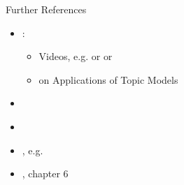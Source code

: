 \documentclass[
  ignorenonframetext,
]{beamer}
\begin{document}
\begin{frame}{Further References}
\protect\hypertarget{further-references}{}

\begin{itemize}

  \item  \href{http://users.umiacs.umd.edu/~jbg/}{\color{blue}{Jordan Boyd Graber at UMD}}: 
 \begin{itemize}
      \item   Videos, e.g. \href{https://www.youtube.com/watch?v=u7l5hhmdc0M}{\color{blue}{Topic Models: Gibbs Sampling}} or \href{https://www.youtube.com/watch?v=CEVELIz4WXM}{\color{blue}{Beta and Dirichlet Distributions}} or \href{https://www.youtube.com/watch?v=0NMC2NfJGqo}{\color{blue}{Clustering: Gaussian Mixture Models}} 
    
  \item \href{https://github.com/ezubaric/TM_applications_book}{\color{blue}{book}} on Applications of Topic Models
  \end{itemize}
  \item  \href{https://ldabook.com}{\color{blue}{The Little LDA book}}
  
  
  \item  \href{https://web.stanford.edu/~hastie/Papers/ESLII}{\color{blue}{The Elements of Statistical Learning}} 
  \item    \href{http://topicmodels.west.uni-koblenz.de/}{\color{blue}{Uni Koblenz}}, e.g. \href{http://topicmodels.west.uni-koblenz.de/ckling/tmt/restaurant.html?parameters=1\%2C2\%2C1\%2C2\%2C1\%2C3\#}{\color{blue}{Animation Polya urn}} 

  \item    \href{https://www.tidytextmining.com/}{\color{blue}{Tidy Text Mining}}, chapter 6
\end{itemize}

\end{frame}
\end{document}

